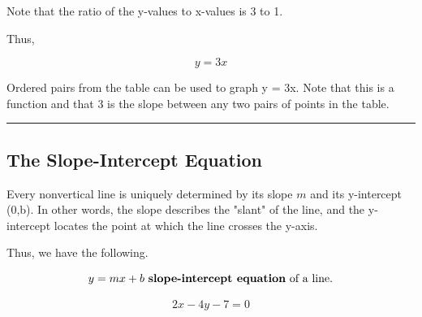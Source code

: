 \documentclass{report}
\begin{document}
\pagebreak
\begin{mdframed}
Note that the ratio of the y-values to x-values is 3 to 1. 
\vspace{1em}

\noindent Thus,

$$ y = 3x$$
\vspace{1em}

\noindent Ordered pairs from the table can be used to graph y = 3x. Note that this is a function and that 3 is the slope between any two pairs of points in the table.
\end{mdframed}
\bigbreak \noindent \bigbreak \noindent
{}
\bigbreak \noindent
\hrule
\subsection{The Slope-Intercept Equation}
\bigbreak \noindent
Every nonvertical line is uniquely determined by its slope $m$ and its y-intercept (0,b). In other words, the slope describes the "slant" of the line, and the y-intercept locates the point at which the line crosses the y-axis.
\vspace{3mm}

\noindent Thus, we have the following.
\vspace{2mm}

$$ y = mx+ b \text{ \textbf{slope-intercept equation} of a line.}$$
\bigbreak \noindent \bigbreak \noindent
{}
\bigbreak \noindent 
\sol{}

$$ 2x-4y-7=0$$
\end{document}
